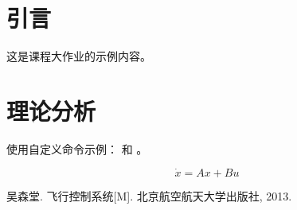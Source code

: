 \documentclass{sysureport}
\author{硕士}
\begin{document}
\maketitle

\section{引言}
这是课程大作业的示例内容。

\section{理论分析}
使用自定义命令示例： 和 。

\begin{equation}
\dot{x} = Ax + Bu
\end{equation}

\begin{thebibliography}{99}
 吴森堂. 飞行控制系统[M]. 北京航空航天大学出版社, 2013.
\end{thebibliography}
\end{document}
